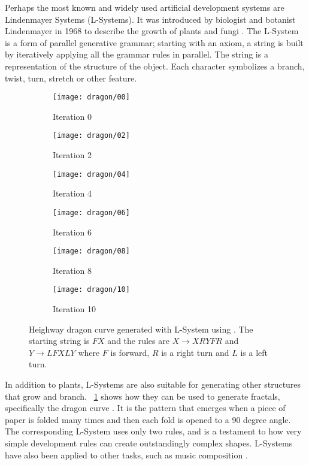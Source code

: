 Perhaps the most known and widely used artificial development systems are Lindenmayer Systems (L-Systems).
It was introduced by biologist and botanist Lindenmayer in 1968 to describe the growth of plants and fungi \cite{lindenmayer1968models}.
The L-System is a form of parallel generative grammar; starting with an axiom, a string is built by iteratively applying all the grammar rules in parallel.
The string is a representation of the structure of the object.
Each character symbolizes a branch, twist, turn, stretch or other feature.

\begin{figure}[!ht]
    \centering
    \begin{subfigure}{0.32\textwidth}
        \centering
        \texttt{[image: dragon/00]}
        \caption{Iteration 0}
    \end{subfigure}
    \begin{subfigure}{0.32\textwidth}
        \centering
        \texttt{[image: dragon/02]}
        \caption{Iteration 2}
    \end{subfigure}
    \begin{subfigure}{0.32\textwidth}
        \centering
        \texttt{[image: dragon/04]}
        \caption{Iteration 4}
    \end{subfigure}
    \par\bigskip
    \begin{subfigure}{0.32\textwidth}
        \centering
        \texttt{[image: dragon/06]}
        \caption{Iteration 6}
    \end{subfigure}
    \begin{subfigure}{0.32\textwidth}
        \centering
        \texttt{[image: dragon/08]}
        \caption{Iteration 8}
    \end{subfigure}
    \begin{subfigure}{0.32\textwidth}
        \centering
        \texttt{[image: dragon/10]}
        \caption{Iteration 10}
    \end{subfigure}
    \caption[Dragon curve]{
        Heighway dragon curve generated with L-System using \cite{lsystemgenerator}.
        The starting string is $FX$ and the rules are $X \rightarrow XRYFR$ and $Y \rightarrow LFXLY$ where $F$ is forward, $R$ is a right turn and $L$ is a left turn.
    }
    \label{fig:dragon-curve}
\end{figure}

In addition to plants, L-Systems are also suitable for generating other structures that grow and branch.
\figurename~\ref{fig:dragon-curve} shows how they can be used to generate fractals, specifically the dragon curve \cite{gardner1967heighway}.
It is the pattern that emerges when a piece of paper is folded many times and then each fold is opened to a 90 degree angle.
The corresponding L-System uses only two rules, and is a testament to how very simple development rules can create outstandingly complex shapes.
L-Systems have also been applied to other tasks, such as music composition \cite{manousakis2006musical}.

